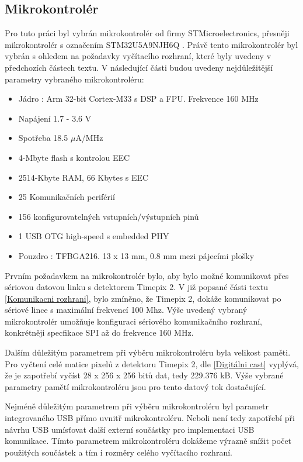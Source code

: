 	\subsection{Mikrokontrolér}
	\label{mikrokontolér}
	Pro tuto práci byl vybrán mikrokontrolér od firmy STMicroelectronics, přesněji mikrokontrolér s označením STM32U5A9NJH6Q \cite{STM32U5A9}. Právě tento mikrokontrolér byl vybrán s ohledem na požadavky vyčítacího rozhraní, které byly uvedeny v předchozích částech textu. V následující části budou uvedeny nejdůležitější parametry vybraného mikrokontroléru:
	\begin{itemize}
		\setlength\itemsep{0.005em}
		\item Jádro : Arm 32-bit Cortex-M33 s DSP a FPU. Frekvence 160 MHz
		\item Napájení 1.7 - 3.6 V
		\item Spotřeba 18.5 $\mu$A/MHz
		\item 4-Mbyte flash s kontrolou EEC
		\item 2514-Kbyte RAM, 66 Kbytes s EEC
		\item 25 Komunikačních periférií
		\item 156 konfigurovatelných vstupních/výstupních pinů
		\item 1 USB OTG high-speed s embedded PHY 
		\item Pouzdro : TFBGA216. 13 x 13 mm, 0.8 mm mezi pájecími plošky
	\end{itemize}
	\par Prvním požadavkem na mikrokontrolér bylo, aby bylo možné komunikovat přes sériovou datovou linku s detektorem Timepix 2. V již popsané části textu \ref{Komunikacni rozhrani}, bylo zmíněno, že Timepix 2, dokáže komunikovat po sériové lince s maximální frekvencí 100 Mhz. Výše uvedený vybraný mikrokontrolér umožňuje konfiguraci sériového komunikačního rozhraní, konkrétněji specfikace SPI až do frekvence 160 MHz. 
	\par Dalším důležitým parametrem při výběru mikrokontroléru byla velikost paměti. Pro vyčtení celé matice pixelů z detektoru Timepix 2, dle \ref{Digitálni cast} vyplývá, že je zapotřebí vyčíst 28 x 256 x 256 bitů dat, tedy 229.376 kB. Výše vybrané parametry pamětí mikrokontroléru jsou pro tento datový tok dostačující.
	\par Nejméně důležitým parametrem při výběru mikrokontroléru byl parametr integrovaného USB přímo uvnitř mikrokontroléru. Neboli není tedy zapotřebí při návrhu USB umísťovat další externí součástky pro implementaci USB komunikace. Tímto parametrem mikrokontroléru dokážeme výrazně snížit počet použitých součástek a tím i rozměry celého vyčítacího rozhraní.
	
